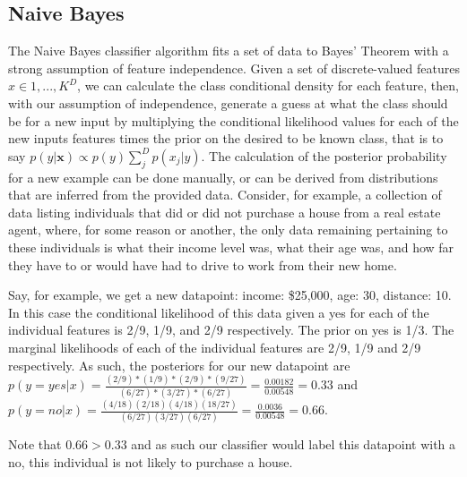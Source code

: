 \subsection{Naive Bayes}
The Naive Bayes classifier algorithm fits a set of data to Bayes' Theorem with a
strong assumption of feature independence. Given a set of discrete-valued
features $x \in {1,...,K}^D$, we can calculate the class conditional density for
each feature, then, with our assumption of independence, generate a guess
at what the class should be for a new input by multiplying the conditional
likelihood values for each of the new inputs features times the prior on the
desired to be known class, that is to say
$p(y|\textbf{x}) \propto p(y) \sum_{j}^{D}p(x_j|y)$.
The calculation of the posterior probability for a new example can be done
manually, or can be derived from distributions that are inferred from the
provided data. Consider, for example, a collection of data listing individuals
that did or did not purchase a house from a real estate agent, where, for some
reason or another, the only data remaining pertaining to these individuals is
what their income level was, what their age was, and how far they have to or
would have had to drive to work from their new home.

Say, for example, we get a new datapoint: income: \$25,000, age: 30, distance: 10. In this
case the conditional likelihood of this data given a yes for each of the
individual features is 2/9, 1/9, and 2/9 respectively. The prior on yes is 1/3.
The marginal likelihoods of each of the individual features are 2/9, 1/9 and 2/9
respectively. As such, the posteriors for our new datapoint are
$p(y=yes|x)=\frac{(2/9)*(1/9)*(2/9)*(9/27)}{(6/27)*(3/27)*(6/27)} = \frac{0.00182}{0.00548} = 0.33$ and $p(y=no|x)=\frac{(4/18)(2/18)(4/18)(18/27)}{(6/27)(3/27)(6/27)} = \frac{0.0036}{0.00548} = 0.66$.

Note that $0.66 > 0.33$ and as such our classifier would label this datapoint
with a no, this individual is not likely to purchase a house.

